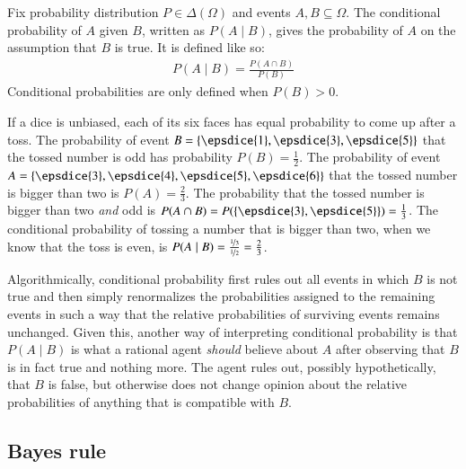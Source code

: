 \documentclass[nobib,nofonts]{tufte-handout}
\begin{document}
Fix probability distribution $P \in \Delta(\Omega)$ and events $A,B \subseteq \Omega$. The
conditional probability of $A$ given $B$, written as $P(A \mid B)$, gives the probability of
$A$ on the assumption that $B$ is true. It is defined like so:
\begin{align*}
  P(A \mid B) = \frac{P(A \cap B)}{P(B)}
\end{align*}
Conditional probabilities are only defined when $P(B) > 0$.


\begin{example}
  If a dice is unbiased, each of its six faces has equal probability to come up after a toss. The
  probability of event $B = \set{\epsdice{1}, \epsdice{3}, \epsdice{5}}$ that the tossed number
  is odd has probability $P(B) = \frac{1}{2}$. The probability of event $A = \set{\epsdice{3}, \epsdice{4},
    \epsdice{5}, \epsdice{6}}$ that the tossed number is bigger than two is $P(A) =
  \frac{2}{3}$. The probability that the tossed number is bigger than two \emph{and} odd is
  $P(A \cap B) = P(\set{\epsdice{3}, \epsdice{5}}) = \frac{1}{3}$. The conditional probability
  of tossing a number that is bigger than two, when we know that the toss is even, is $P(A \mid
  B) = \frac{\nicefrac{1}{3}}{\nicefrac{1}{2}} = \frac{2}{3}$.
\end{example}

Algorithmically, conditional probability first rules out all events in which $B$ is not true
and then simply renormalizes the probabilities assigned to the remaining events in such a way
that the relative probabilities of surviving events remains unchanged. Given this, another way
of interpreting conditional probability is that $P(A \mid B)$ is what a rational agent
\emph{should} believe about $A$ after observing that $B$ is in fact true and nothing more. The
agent rules out, possibly hypothetically, that $B$ is false, but otherwise does not change
opinion about the relative probabilities of anything that is compatible with $B$.

\subsection{Bayes rule}
\end{document}
